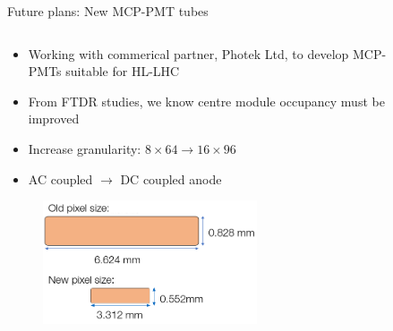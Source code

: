 \documentclass[xcolor={dvipsnames}]{beamer}
\begin{document}
\begin{frame}{Future plans: New MCP-PMT tubes}
  \begin{columns}
    \begin{column}{0.58\textwidth}
      \begin{itemize}
        \setlength\itemsep{1.0em}
        \item{Working with commerical partner, Photek Ltd, to develop MCP-PMTs suitable for HL-LHC}
        \item{From FTDR studies, we know centre module occupancy must be improved}
        \item{Increase granularity: $8\times 64\to 16\times 96$}
        \item{AC coupled $\to$ DC coupled anode}
      \end{itemize}
      \vspace{0.0cm}
      \begin{figure}
        \centering
        \includegraphics[width = 0.68\textwidth]{Figs/NewMCPSizeComparison.png}
      \end{figure}
    \end{column}
    \begin{column}{0.42\textwidth}
      \begin{figure}
        \centering

\end{figure}
\end{column}
\end{columns}
\end{frame}
\end{document}
